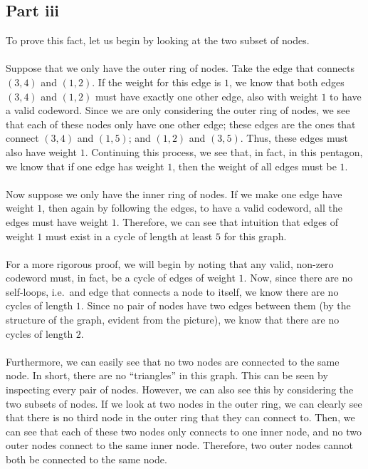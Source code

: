 \documentclass[letterpaper]{article}
\begin{document}
\subsection{Part iii}
\label{sub:5Partiii}
To prove this fact, let us begin by looking at the two subset of nodes.
\\ \\
Suppose that we only have the outer ring of nodes.
Take the edge that connects $ (3,4) $ and $ (1,2) $.
If the weight for this edge is $ 1 $, we know that both edges $ (3,4) $ and $ (1,2) $ must have exactly one other edge, also with weight $ 1 $ to have a valid codeword.
Since we are only considering the outer ring of nodes, we see that each of these nodes only have one other edge; these edges are the ones that connect $ (3,4) $ and $ (1,5) $; and $ (1,2) $ and $ (3,5)$.
Thus, these edges must also have weight $ 1 $.
Continuing this process, we see that, in fact, in this pentagon, we know that if one edge has weight $ 1 $, then the weight of all edges must be $ 1 $.
\\ \\
Now suppose we only have the inner ring of nodes.
If we make one edge have weight $ 1 $, then again by following the edges, to have a valid codeword, all the edges must have weight $ 1 $.
Therefore, we can see that intuition that edges of weight $ 1 $ must exist in a cycle of length at least $ 5 $ for this graph.
\\ \\
For a more rigorous proof, we will begin by noting that any valid, non-zero codeword must, in fact, be a cycle of edges of weight $ 1 $.
Now, since there are no self-loops, i.e.\ and edge that connects a node to itself, we know there are no cycles of length $ 1 $.
Since no pair of nodes have two edges between them (by the structure of the graph, evident from the picture), we know that there are no cycles of length $ 2 $.
\\ \\
Furthermore, we can easily see that no two nodes are connected to the same node.
In short, there are no ``triangles'' in this graph.
This can be seen by inspecting every pair of nodes.
However, we can also see this by considering the two subsets of nodes.
If we look at two nodes in the outer ring, we can clearly see that there is no third node in the outer ring that they can connect to.
Then, we can see that each of these two nodes only connects to one inner node, and no two outer nodes connect to the same inner node.
Therefore, two outer nodes cannot both be connected to the same node.
\end{document}
